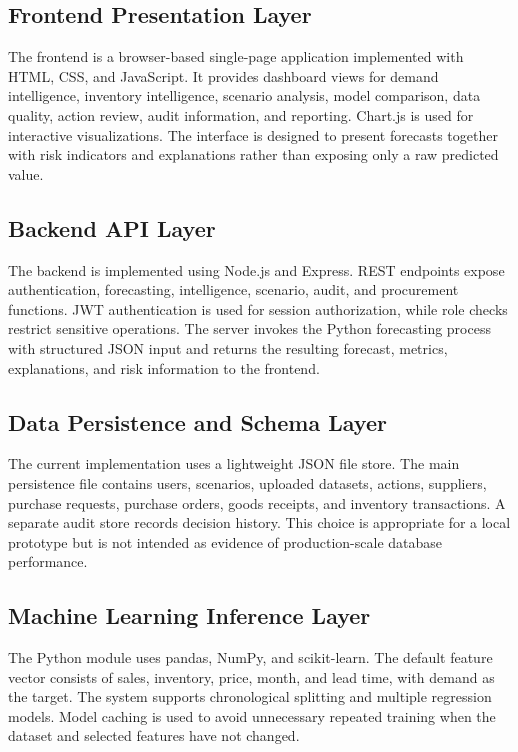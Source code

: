 \documentclass[9pt,conference]{IEEEtran}
\providecommand{\syscite}[1]{}
\begin{document}
\subsection{Frontend Presentation Layer}
The frontend is a browser-based single-page application implemented with HTML, CSS, and JavaScript. \syscite{[cite: 1]} It provides dashboard views for demand intelligence, inventory intelligence, scenario analysis, model comparison, data quality, action review, audit information, and reporting. \syscite{[cite: 1]} Chart.js is used for interactive visualizations. \syscite{[cite: 1]} The interface is designed to present forecasts together with risk indicators and explanations rather than exposing only a raw predicted value. \syscite{[cite: 1]}

\subsection{Backend API Layer}
The backend is implemented using Node.js and Express. \syscite{[cite: 1]} REST endpoints expose authentication, forecasting, intelligence, scenario, audit, and procurement functions. \syscite{[cite: 1]} JWT authentication is used for session authorization, while role checks restrict sensitive operations. \syscite{[cite: 1]} The server invokes the Python forecasting process with structured JSON input and returns the resulting forecast, metrics, explanations, and risk information to the frontend. \syscite{[cite: 1]}

\subsection{Data Persistence and Schema Layer}
The current implementation uses a lightweight JSON file store. \syscite{[cite: 1]} The main persistence file contains users, scenarios, uploaded datasets, actions, suppliers, purchase requests, purchase orders, goods receipts, and inventory transactions. \syscite{[cite: 1]} A separate audit store records decision history. \syscite{[cite: 1]} This choice is appropriate for a local prototype but is not intended as evidence of production-scale database performance. \syscite{[cite: 1]}

\subsection{Machine Learning Inference Layer}
The Python module uses pandas, NumPy, and scikit-learn. \syscite{[cite: 1]} The default feature vector consists of sales, inventory, price, month, and lead time, with demand as the target. \syscite{[cite: 1]} The system supports chronological splitting and multiple regression models. \syscite{[cite: 1]} Model caching is used to avoid unnecessary repeated training when the dataset and selected features have not changed. \syscite{[cite: 1]}
\end{document}
